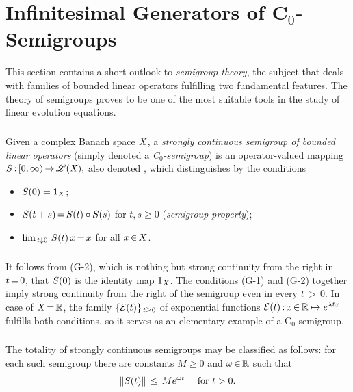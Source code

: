 \documentclass[11pt,twoside]{article}
\begin{document}
\section{Infinitesimal Generators of C$_0$-Semigroups}                         %
This section contains a short outlook to \textit{semigroup theory},
the subject that deals with families of bounded linear operators
fulfilling two fundamental features.
The theory of semigroups proves to be one of the most suitable tools
in the study of linear evolution equations.

\subparagraph{} %
Given a complex Banach space $\banX$,
a \textit{strongly continuous semigroup of bounded linear operators}
(simply denoted a \textit{C$_0$-semigroup}) is an operator-valued mapping
$
\linS \: [0,\infty) \xto \BO{\banX},
$
also denoted {\SG},
which distinguishes by the conditions

\begin{itemize}[leftmargin=15mm]
\item[(G-0)]
\;$\linS(0) = \1_{\banX}$;

\item[(G-1)]
\;$\linS(t+s) \eq \linS(t) \circ \linS(s)$ for $t,s \geq 0$
(\textit{semigroup property});

\item[(G-2)]
\;$\lim_{\,t \downarrow 0} \, \linS(t)\,x \eq x$ for all $x \xeof X$.
\end{itemize}

\subparagraph{} %
It follows from (G-2),
which is nothing but strong continuity from the right in $t \eq 0$,
that $\linS(0)$ is the identity map $\1_{\banX}$.
The conditions (G-1) and (G-2) together
imply strong continuity from the right of the semigroup
even in every $t {\,>\,} 0$.
In case of $\banX \eq \R$,
the family $\{\cal{E}(t)\}_{\, t \geq 0}$ of exponential functions
$\cal{E}(t) \: x \xeof \R \mapsto e^{\lambda tx}$
fulfills both conditions,
so it serves as an elementary example of a C$_0$-semigroup.

\subparagraph{} %
The totality of strongly continuous semigroups
may be classified as follows:
for each such semigroup {\SG} there are constants $M \geq 0$
and $\omega \xeof \R$
such that
\begin{equation}\label{X_SEMIGROUP_GROWTH}
\norm{\linS(t)} \, \leq \, M e^{\omega t}
\quad \for t > 0.
\end{equation}
\end{document}
